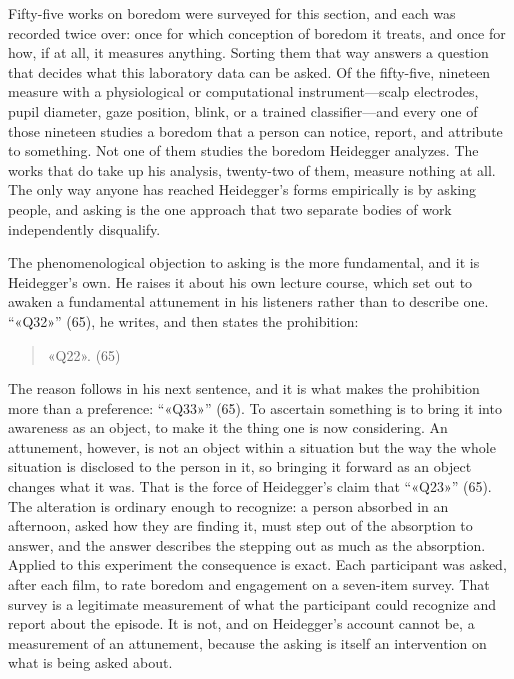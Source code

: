 
Fifty-five works on boredom were surveyed for this section, and each was recorded twice over:
once for which conception of boredom it treats, and once for how, if at all, it measures
anything. Sorting them that way answers a question that decides what this laboratory data can
be asked. Of the fifty-five, nineteen measure with a physiological or computational
instrument---scalp electrodes, pupil diameter, gaze position, blink, or a trained
classifier---and every one of those nineteen studies a boredom that a person can notice, report,
and attribute to something. Not one of them studies the boredom Heidegger analyzes. The works
that do take up his analysis, twenty-two of them, measure nothing at all. The only way anyone
has reached Heidegger's forms empirically is by asking people, and asking is the one approach
that two separate bodies of work independently disqualify.

The phenomenological objection to asking is the more fundamental, and it is Heidegger's own. He
raises it about his own lecture course, which set out to awaken a fundamental attunement in his
listeners rather than to describe one. ``«Q32»'' (65), he writes, and then states the
prohibition:

\begin{quote}
«Q22». (65)
\end{quote}

\noindent The reason follows in his next sentence, and it is what makes the prohibition more
than a preference: ``«Q33»'' (65). To ascertain something is to bring it into awareness as an
object, to make it the thing one is now considering. An attunement, however, is not an object
within a situation but the way the whole situation is disclosed to the person in it, so
bringing it forward as an object changes what it was. That is the force of Heidegger's claim
that ``«Q23»'' (65). The alteration is ordinary enough to recognize: a person absorbed in an
afternoon, asked how they are finding it, must step out of the absorption to answer, and the
answer describes the stepping out as much as the absorption. Applied to this experiment the
consequence is exact. Each participant was asked, after each film, to rate boredom and
engagement on a seven-item survey. That survey is a legitimate measurement of what the
participant could recognize and report about the episode. It is not, and on Heidegger's account
cannot be, a measurement of an attunement, because the asking is itself an
intervention on what is being asked about.

